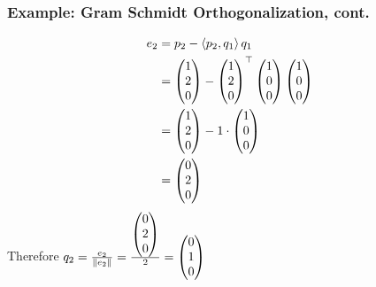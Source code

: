 \documentclass{beamer}
\begin{document}
\begin{frame}\frametitle{Example: Gram Schmidt Orthogonalization, cont.}

\begin{align*}
e_2 &= p_2 - \left<p_2, q_1\right> q_1 \\
    &= \begin{pmatrix} 1 \\ 2 \\ 0 \end{pmatrix} - \begin{pmatrix} 1\\2\\0\end{pmatrix}^\top\begin{pmatrix}1\\0\\0\end{pmatrix}\begin{pmatrix}1\\0\\0\end{pmatrix} \\
    &= \begin{pmatrix} 1 \\ 2 \\ 0 \end{pmatrix} - 1\cdot\begin{pmatrix}1\\0\\0\end{pmatrix} \\
    &= \begin{pmatrix}0\\2\\0\end{pmatrix}
\end{align*}
Therefore
\(
q_2 = \frac{e_2}{\left\|e_2\right\|} = \frac{\begin{pmatrix}0\\2\\0\end{pmatrix}}{2} = \begin{pmatrix}0\\1\\0\end{pmatrix}
\)

\end{frame}
\end{document}
